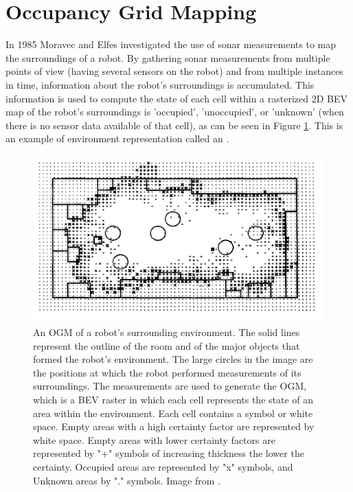 \section{Occupancy Grid Mapping} \label{sec:ogm}
In 1985 Moravec and Elfes \cite{moravec1985high} investigated the use of sonar measurements to map the surroundings of a robot. By gathering sonar measurements from multiple points of view (having several sensors on the robot) and from multiple instances in time, information about the robot's surroundings is accumulated. This information is used to compute the state of each cell within a rasterized 2D \gls{BEV} map of the robot's surroundings is 'occupied', 'unoccupied', or 'unknown' (when there is no sensor data available of that cell), as can be seen in Figure \ref{fig:OGMBEVmoravec}. This is an example of environment representation called an . \\

\begin{figure}[h]
	\centering
	\includegraphics[width=0.6\linewidth]{Figures/Occupancy_Grid_Map/The_Two-dimensional_Sonar_map}
	\caption{An \gls{OGM} of a robot's surrounding environment. The solid lines represent the outline of the room and of the major objects that formed the robot's environment. The large circles in the image are the positions at which the robot performed measurements of its surroundings. The measurements are used to generate the \gls{OGM}, which is a \gls{BEV} raster in which each cell represents the state of an area within the environment. Each cell contains a symbol or white space. Empty areas with a high certainty factor are represented by white space. Empty areas with lower certainty factors are represented by "+" symbols of increasing thickness the lower the certainty. Occupied areas are represented by "x" symbols, and Unknown areas by "." symbols. Image from \cite{moravec1985high}.}
	\label{fig:OGMBEVmoravec}
\end{figure}

